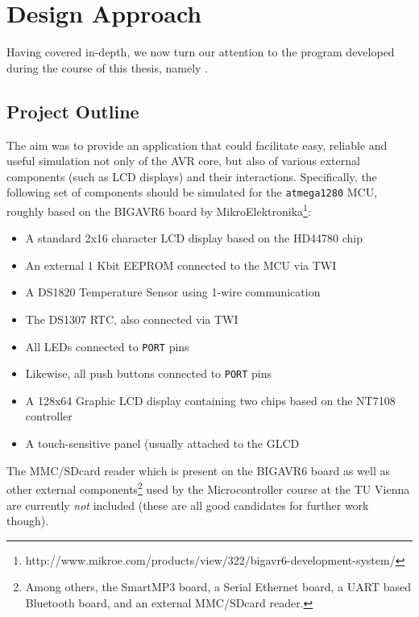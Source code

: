 
\chapter{Design Approach} \label{chapter:designapproach}

Having covered \simavr in-depth, we now turn our attention to the program developed
during the course of this thesis, namely \qsimavr.

\section{Project Outline} \label{section:project_outline}

The aim was to provide an application that could facilitate easy, reliable and
useful simulation not only of the \ac{AVR} core, but also of various external
components (such as \ac{LCD} displays) and their interactions. Specifically,
the following set of components should be simulated for the \verb|atmega1280|
\ac{MCU}, roughly based on the BIGAVR6 board by MikroElektronika\footnote{
%
http://www.mikroe.com/products/view/322/bigavr6-development-system/
%
}:

\begin{itemize}
\item A standard 2x16 character \ac{LCD} display based on the HD44780 chip
\item An external 1 Kbit \ac{EEPROM} connected to the \ac{MCU} via \ac{TWI}
\item A DS1820 Temperature Sensor using 1-wire communication
\item The DS1307 \ac{RTC}, also connected via \ac{TWI}
\item All \acp{LED} connected to \verb|PORT| pins
\item Likewise, all push buttons connected to \verb|PORT| pins
\item A 128x64 Graphic \ac{LCD} display containing two chips based on the NT7108 controller
\item A touch-sensitive panel (usually attached to the \ac{GLCD}
\end{itemize}

The MMC/SDcard reader which is present on the BIGAVR6 board as well as
other external components\footnote{
%
Among others, the SmartMP3 board, a Serial Ethernet board, a \ac{UART} based
Bluetooth board, and an external MMC/SDcard reader.
%
} used by the Microcontroller course at the \ac{TU} Vienna are currently \emph{not} included (these are all good
candidates for further work though).

